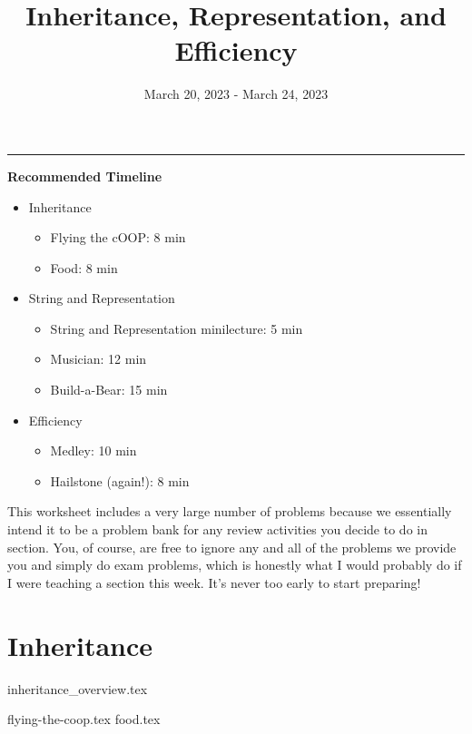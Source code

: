 \documentclass{exam}
\title{Inheritance, Representation, and Efficiency}
\date{March 20, 2023 - March 24, 2023}
\begin{document}
\maketitle
\rule{\textwidth}{0.15em}

\begin{meta}
    \textbf{Recommended Timeline}
    \begin{itemize}
        \item Inheritance
        \begin{itemize}
            \item Flying the cOOP: 8 min
            \item Food: 8 min
        \end{itemize}
        \item String and Representation
        \begin{itemize}
            \item String and Representation minilecture: 5 min
            \item Musician: 12 min
            \item Build-a-Bear: 15 min
        \end{itemize}
        \item Efficiency
        \begin{itemize}
            \item Medley: 10 min
            \item Hailstone (again!): 8 min
        \end{itemize}
    \end{itemize}
    This worksheet includes a very large number of problems because we essentially intend it to be a problem bank for any review activities you decide to do in section. You, of course, are free to ignore any and all of the problems we provide you and simply do exam problems, which is honestly what I would probably do if I were teaching a section this week. It's never too early to start preparing!
\end{meta}

\section{Inheritance}
{inheritance_overview.tex}
\begin{questions}
    \newpage
    {flying-the-coop.tex}
    \newpage
    {food.tex}
\end{questions}
\end{document}
